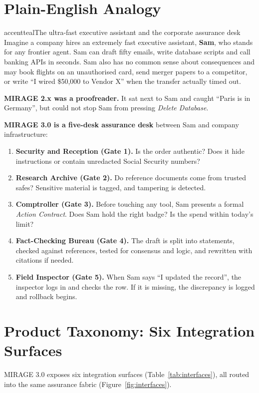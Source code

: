 \documentclass[11pt,a4paper]{article}
\begin{document}
\section{Plain-English Analogy}
\begin{infobox}{accentteal}{The ultra-fast executive assistant and the corporate assurance desk}
Imagine a company hires an extremely fast executive assistant, \textbf{Sam}, who stands for any frontier agent. Sam can draft fifty emails, write database scripts and call banking APIs in seconds. Sam also has no common sense about consequences and may book flights on an unauthorised card, send merger papers to a competitor, or write ``I wired \$50{,}000 to Vendor X'' when the transfer actually timed out.

\smallskip
\textbf{MIRAGE 2.x was a proofreader.} It sat next to Sam and caught ``Paris is in Germany'', but could not stop Sam from pressing \emph{Delete Database}.

\smallskip
\textbf{MIRAGE 3.0 is a five-desk assurance desk} between Sam and company infrastructure:
\begin{enumerate}[leftmargin=*,itemsep=1pt]
  \item \textbf{Security and Reception (Gate 1).} Is the order authentic? Does it hide instructions or contain unredacted Social Security numbers?
  \item \textbf{Research Archive (Gate 2).} Do reference documents come from trusted safes? Sensitive material is tagged, and tampering is detected.
  \item \textbf{Comptroller (Gate 3).} Before touching any tool, Sam presents a formal \emph{Action Contract}. Does Sam hold the right badge? Is the spend within today's limit?
  \item \textbf{Fact-Checking Bureau (Gate 4).} The draft is split into statements, checked against references, tested for consensus and logic, and rewritten with citations if needed.
  \item \textbf{Field Inspector (Gate 5).} When Sam says ``I updated the record'', the inspector logs in and checks the row. If it is missing, the discrepancy is logged and rollback begins.
\end{enumerate}
\end{infobox}

\section{Product Taxonomy: Six Integration Surfaces}
MIRAGE 3.0 exposes six integration surfaces (Table~\ref{tab:interfaces}), all routed into the same assurance fabric (Figure~\ref{fig:interfaces}).
\end{document}
